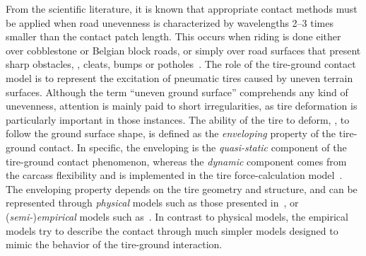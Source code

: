 From the scientific literature, it is known that appropriate contact methods must be applied when road unevenness is characterized by wavelengths 2--3 times smaller than the contact patch length. This occurs when riding is done either over cobblestone or Belgian block roads, or simply over road surfaces that present sharp obstacles, \eg{}, cleats, bumps or potholes~\cite{pacejka2012tire}. The role of the tire-ground contact model is to represent the excitation of pneumatic tires caused by uneven terrain surfaces. Although the term ``uneven ground surface'' comprehends any kind of unevenness, attention is mainly paid to short irregularities, as tire deformation is particularly important in those instances. The ability of the tire to deform, \ie{}, to follow the ground surface shape, is defined as the \emph{enveloping} property of the tire-ground contact. In specific, the enveloping is the \emph{quasi-static} component of the tire-ground contact phenomenon, whereas the \emph{dynamic} component comes from the carcass flexibility and is implemented in the tire force-calculation model~\cite{pacejka2012tire, schmeitz2004semiempirical}. The enveloping property depends on the tire geometry and structure, and can be represented through \emph{physical} models such as those presented in~\cite{davis1975radial, badalamenti1988radial, negrut1994dynamic, mousseau2003obstacle, kim2008two}, or (\emph{semi-})\emph{empirical} models such as~\cite{rill2013tmeasy, schmeitz2004semiempirical}. In contrast to physical models, the empirical models try to describe the contact through much simpler models designed to mimic the behavior of the tire-ground interaction.

